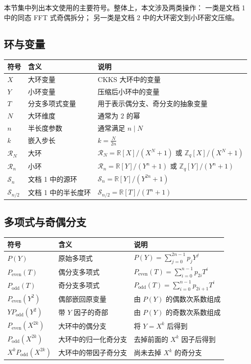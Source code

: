 \documentclass[11pt]{article}
\newcommand{\Rbig}{\mathcal R_N}
\newcommand{\Rsmall}{\mathcal R_n}
\newcommand{\Sn}{\mathcal S_n}
\newcommand{\Snh}{\mathcal S_{n/2}}
\newcommand{\Pe}{P_{\mathrm{even}}}
\newcommand{\Po}{P_{\mathrm{odd}}}
\begin{document}
本节集中列出本文使用的主要符号。整体上，本文涉及两类操作：
一类是文档 1 中的同态 FFT 式奇偶拆分；
另一类是文档 2 中的大环密文到小环密文压缩。

\subsection{环与变量}

\begin{center}
\begin{tabular}{lll}
\toprule
符号 & 含义 & 说明 \\
\midrule
\(X\) & 大环变量 & CKKS 大环中的变量 \\
\(Y\) & 小环变量 & 压缩后小环中的变量 \\
\(T\) & 分支多项式变量 & 用于表示偶分支、奇分支的抽象变量 \\
\(N\) & 大环维度 & 通常为 \(2\) 的幂 \\
\(n\) & 半长度参数 & 通常满足 \(n\mid N\) \\
\(k\) & 嵌入步长 & \(k=\frac{N}{2n}\) \\
\(\Rbig\) & 大环 & \(\mathcal R_N=\mathbb R[X]/(X^N+1)\) 或 \(\mathbb Z_q[X]/(X^N+1)\) \\
\(\Rsmall\) & 小环 & \(\mathcal R_n=\mathbb R[Y]/(Y^n+1)\) 或 \(\mathbb Z_q[Y]/(Y^n+1)\) \\
\(\Sn\) & 文档 1 中的源环 & \(\mathcal S_n=\mathbb R[Y]/(Y^{2n}+1)\) \\
\(\Snh\) & 文档 1 中的半长度环 & \(\mathcal S_{n/2}=\mathbb R[T]/(T^n+1)\) \\
\bottomrule
\end{tabular}
\end{center}

\subsection{多项式与奇偶分支}

\begin{center}
\begin{tabular}{lll}
\toprule
符号 & 含义 & 说明 \\
\midrule
\(P(Y)\) & 原始多项式 & \(P(Y)=\sum_{j=0}^{2n-1}p_jY^j\) \\
\(\Pe(T)\) & 偶分支多项式 & \(\Pe(T)=\sum_{i=0}^{n-1}p_{2i}T^i\) \\
\(\Po(T)\) & 奇分支多项式 & \(\Po(T)=\sum_{i=0}^{n-1}p_{2i+1}T^i\) \\
\(\Pe(Y^2)\) & 偶部嵌回原变量 & 由 \(P(Y)\) 的偶数次系数组成 \\
\(Y\Po(Y^2)\) & 带 \(Y\) 因子的奇部 & 由 \(P(Y)\) 的奇数次系数组成 \\
\(\Pe(X^{2k})\) & 大环中的偶分支 & 将 \(Y=X^k\) 后得到 \\
\(\Po(X^{2k})\) & 大环中的归一化奇分支 & 去掉前面的 \(X^k\) 因子后得到 \\
\(X^k\Po(X^{2k})\) & 大环中的带因子奇分支 & 尚未去掉 \(X^k\) 的奇分支 \\
\bottomrule
\end{tabular}
\end{center}
\end{document}
